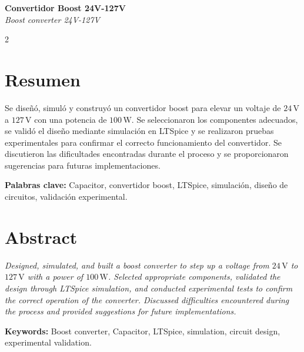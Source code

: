 \documentclass[12pt,a4paper]{article}
\begin{document}
\begin{center}
  {\fontsize{16}{18}\bfseries Convertidor Boost 24V-127V}\\[0.5cm]
  {\fontsize{14}{16}\itshape Boost converter 24V-127V}\\[1cm] 
  \begin{multicols}{2}




  \end{multicols}
\end{center}
\section*{Resumen}
Se diseñó, simuló y construyó un convertidor boost para elevar un voltaje de $24\,\mathrm{V}$ a $127\,\mathrm{V}$ con una potencia de $100\,\mathrm{W}$. Se seleccionaron los componentes adecuados, se validó el diseño mediante simulación en LTSpice y se realizaron pruebas experimentales para confirmar el correcto funcionamiento del convertidor. Se discutieron las dificultades encontradas durante el proceso y se proporcionaron sugerencias para futuras implementaciones.

\noindent \textbf{Palabras clave:} Capacitor, convertidor boost, LTSpice, simulación, diseño de circuitos, validación experimental.

\section*{Abstract}
\emph{Designed, simulated, and built a boost converter to step up a voltage from $24\,\mathrm{V}$ to $127\,\mathrm{V}$ with a power of $100\,\mathrm{W}$. Selected appropriate components, validated the design through LTSpice simulation, and conducted experimental tests to confirm the correct operation of the converter. Discussed difficulties encountered during the process and provided suggestions for future implementations.}

\noindent \textbf{Keywords:} Boost converter, Capacitor, LTSpice, simulation, circuit design, experimental validation.
\newpage
\end{document}
